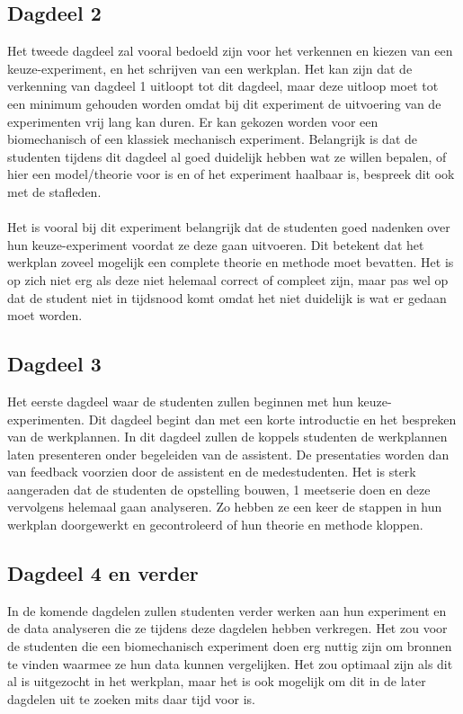 \documentclass{article}
\begin{document}
\subsection{Dagdeel 2}
Het tweede dagdeel zal vooral bedoeld zijn voor het verkennen en kiezen van een keuze-experiment, en het schrijven van een werkplan. Het kan zijn dat de verkenning van dagdeel 1 uitloopt tot dit dagdeel, maar deze uitloop moet tot een minimum gehouden worden omdat bij dit experiment de uitvoering van de experimenten vrij lang kan duren. Er kan gekozen worden voor een biomechanisch of een klassiek mechanisch experiment. Belangrijk is dat de studenten tijdens dit dagdeel al goed duidelijk hebben wat ze willen bepalen, of hier een model/theorie voor is en of het experiment haalbaar is, bespreek dit ook met de stafleden. \\\\ Het is vooral bij dit experiment belangrijk dat de studenten goed nadenken over hun keuze-experiment voordat ze deze gaan uitvoeren. Dit betekent dat het werkplan zoveel mogelijk een complete theorie en methode moet bevatten. Het is op zich niet erg als deze niet helemaal correct of compleet zijn, maar pas wel op dat de student niet in tijdsnood komt omdat het niet duidelijk is wat er gedaan moet worden.

\subsection{Dagdeel 3}
Het eerste dagdeel waar de studenten zullen beginnen met hun keuze-experimenten. Dit dagdeel begint dan met een korte introductie en het bespreken van de werkplannen. In dit dagdeel zullen de koppels studenten de werkplannen laten presenteren onder begeleiden van de assistent. De presentaties worden dan van feedback voorzien door de assistent en de medestudenten. Het is sterk aangeraden dat de studenten de opstelling bouwen, 1 meetserie doen en deze vervolgens helemaal gaan analyseren. Zo hebben ze een keer de stappen in hun werkplan doorgewerkt en gecontroleerd of hun theorie en methode kloppen.

\subsection{Dagdeel 4 en verder}
In de komende dagdelen zullen studenten verder werken aan hun experiment en de data analyseren die ze tijdens deze dagdelen hebben verkregen. Het zou voor de studenten die een biomechanisch experiment doen erg nuttig zijn om bronnen te vinden waarmee ze hun data kunnen vergelijken. Het zou optimaal zijn als dit al is uitgezocht in het werkplan, maar het is ook mogelijk om dit in de later dagdelen uit te zoeken mits daar tijd voor is. 
\end{document}
